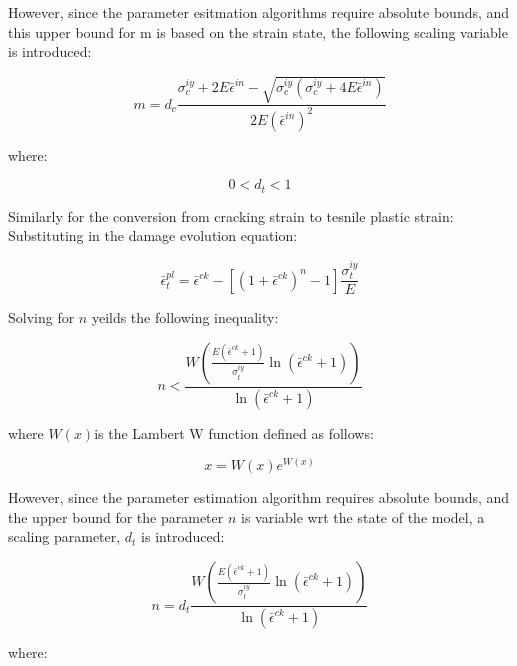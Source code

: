 However, since the parameter esitmation algorithms require absolute
bounds, and this upper bound for m is based on the strain state, the
following scaling variable is introduced:

\begin{equation}
m=d_{c}\frac{\sigma_{c}^{iy}+2E\bar{\epsilon}^{in}-\sqrt{\sigma_{c}^{iy}\left(\sigma_{c}^{iy}+4E\bar{\epsilon}^{in}\right)}}{2E\left(\bar{\epsilon}^{in}\right)^{2}}\label{eqn:param14}
\end{equation}


where:

\begin{equation}
0<d_{t}<1\label{eqn:param15}
\end{equation}


Similarly for the conversion from cracking strain to tesnile plastic
strain: Substituting in the damage evolution equation:

\begin{equation}
\bar{\epsilon}_{t}^{pl}=\bar{\epsilon}^{ck}-\left[\left(1+\bar{\epsilon}^{ck}\right)^{n}-1\right]\frac{\sigma_{t}^{iy}}{E}\label{eqn:param5-1}
\end{equation}


Solving for $n$ yeilds the following inequality:

\begin{equation}
n<\frac{W\left(\frac{E\left(\bar{\epsilon}^{ck}+1\right)}{\sigma_{t}^{iy}}\ln\left(\bar{\epsilon}^{ck}+1\right)\right)}{\ln\left(\bar{\epsilon}^{ck}+1\right)}\label{eqn:param7}
\end{equation}


where $W\left(x\right)$is the Lambert W function defined as follows:

\begin{equation}
x=W\left(x\right)e^{W(x)}\label{eqn:param8}
\end{equation}


However, since the parameter estimation algorithm requires absolute
bounds, and the upper bound for the parameter $n$ is variable wrt
the state of the model, a scaling parameter, $d_{t}$ is introduced:

\begin{equation}
n=d_{t}\frac{W\left(\frac{E\left(\bar{\epsilon}^{ck}+1\right)}{\sigma_{t}^{iy}}\ln\left(\bar{\epsilon}^{ck}+1\right)\right)}{\ln\left(\bar{\epsilon}^{ck}+1\right)}\label{eqn:param9}
\end{equation}


where:

